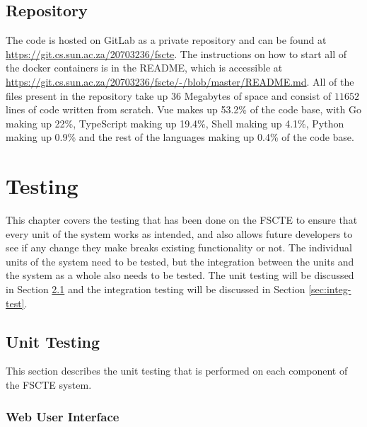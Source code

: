 \documentclass[a4paper, 11pt]{report}
\begin{document}
\section{Repository}

The code is hosted on GitLab as a private repository and can be found at
\url{https://git.cs.sun.ac.za/20703236/fscte}. The instructions on how to start
all of the docker containers is in the README, which is accessible at
\url{https://git.cs.sun.ac.za/20703236/fscte/-/blob/master/README.md}. All of
the files present in the repository take up 36 Megabytes of space and consist
of $11 652$ lines of code written from scratch. Vue makes up 53.2\% of the code
base, with Go making up 22\%, TypeScript making up 19.4\%, Shell making up 4.1\%,
Python making up 0.9\% and the rest of the languages making up 0.4\% of the code
base.

\chapter{Testing}
\label{chap:testing}

This chapter covers the testing that has been done on the FSCTE to ensure that
every unit of the system works as intended, and also allows future developers to
see if any change they make breaks existing functionality or not. The individual
units of the system need to be tested, but the integration between the units and
the system as a whole also needs to be tested. The unit testing will be discussed
in Section \ref{sec:unit-test} and the integration testing will be discussed in
Section \ref{sec:integ-test}.

\section{Unit Testing}
\label{sec:unit-test}

This section describes the unit testing that is performed on each component of
the FSCTE system.

\subsection{Web User Interface}
\end{document}
